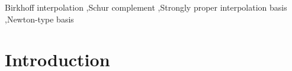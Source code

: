 \documentclass[preprint,12pt]{elsarticle}
\begin{document}
\begin{frontmatter}


\begin{keyword}
Birkhoff interpolation \sep Schur complement \sep Strongly proper interpolation basis \sep Newton-type basis



\end{keyword}

\end{frontmatter}



\section{Introduction}

\end{document}
